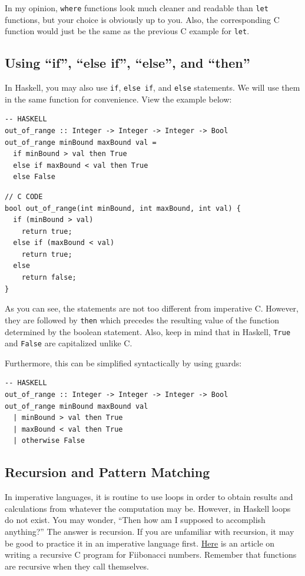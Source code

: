 \documentclass{article}
\begin{document}
\medskip\noindent
In my opinion, \verb|where| functions look much cleaner and readable than \verb|let| functions, but your choice is obviously up to you. Also, the corresponding C function would just be the same as the previous C example for \verb|let|.

\subsection{Using “if”, “else if”, “else”, and “then”}
\medskip\noindent
In Haskell, you may also use \verb|if|, \verb|else if|, and \verb|else| statements. We will use them in the same function for convenience. View the example below:

\begin{lstlisting}[style=HaskellStyle]
-- HASKELL
out_of_range :: Integer -> Integer -> Integer -> Bool
out_of_range minBound maxBound val =
  if minBound > val then True
  else if maxBound < val then True
  else False
\end{lstlisting}

\begin{lstlisting}[style=CStyle]
// C CODE
bool out_of_range(int minBound, int maxBound, int val) {
  if (minBound > val)
    return true;
  else if (maxBound < val)
    return true;
  else 
    return false;
}
\end{lstlisting}

\medskip\noindent
As you can see, the statements are not too different from imperative C. However, they are followed by \verb|then| which precedes the resulting value of the function determined by the boolean statement. Also, keep in mind that in Haskell, \verb|True| and \verb|False| are capitalized unlike C.

\medskip\noindent
Furthermore, this can be simplified syntactically by using guards:

\begin{lstlisting}[style=HaskellStyle]
-- HASKELL
out_of_range :: Integer -> Integer -> Integer -> Bool
out_of_range minBound maxBound val
  | minBound > val then True
  | maxBound < val then True
  | otherwise False
\end{lstlisting}

\subsection{Recursion and Pattern Matching}
\medskip\noindent
In imperative languages, it is routine to use loops in order to obtain results and calculations from whatever the computation may be. However, in Haskell loops do not exist. You may wonder, “Then how am I supposed to accomplish anything?” The answer is recursion. If you are unfamiliar with recursion, it may be good to practice it in an imperative language first. \href{https://www.geeksforgeeks.org/c-program-for-fibonacci-numbers/}{Here} is an article on writing a recursive C program for Fiibonacci numbers. Remember that functions are recursive when they call themselves.
\end{document}
